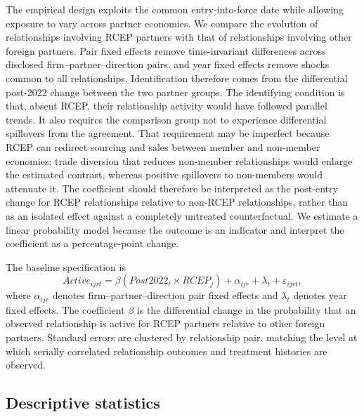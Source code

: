 \documentclass[preprint,12pt,authoryear]{elsarticle}
\begin{document}
The empirical design exploits the common entry-into-force date while allowing exposure to vary across partner economies. We compare the evolution of relationships involving RCEP partners with that of relationships involving other foreign partners. Pair fixed effects remove time-invariant differences across disclosed firm--partner--direction pairs, and year fixed effects remove shocks common to all relationships. Identification therefore comes from the differential post-2022 change between the two partner groups. The identifying condition is that, absent RCEP, their relationship activity would have followed parallel trends. It also requires the comparison group not to experience differential spillovers from the agreement. That requirement may be imperfect because RCEP can redirect sourcing and sales between member and non-member economies: trade diversion that reduces non-member relationships would enlarge the estimated contrast, whereas positive spillovers to non-members would attenuate it. The coefficient should therefore be interpreted as the post-entry change for RCEP relationships relative to non-RCEP relationships, rather than as an isolated effect against a completely untreated counterfactual. We estimate a linear probability model because the outcome is an indicator and interpret the coefficient as a percentage-point change.

The baseline specification is
\begin{equation}
\label{eq:did}
Active_{ijrt}=\beta(Post2022_t\times RCEP_j)+\alpha_{ijr}+\lambda_t+\varepsilon_{ijrt},
\end{equation}
where $\alpha_{ijr}$ denotes firm--partner--direction pair fixed effects and $\lambda_t$ denotes year fixed effects. The coefficient $\beta$ is the differential change in the probability that an observed relationship is active for RCEP partners relative to other foreign partners. Standard errors are clustered by relationship pair, matching the level at which serially correlated relationship outcomes and treatment histories are observed.

\subsection{Descriptive statistics}
\end{document}
